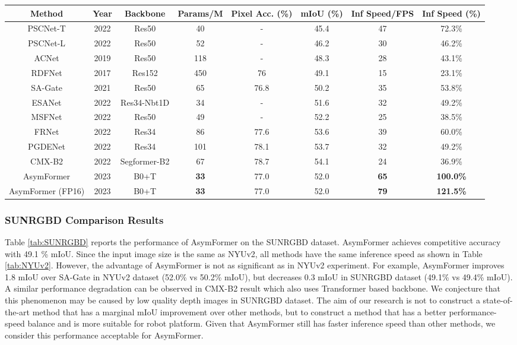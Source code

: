 \documentclass[letterpaper, 10 pt, conference]{ieeeconf}
\begin{document}
\begin{table*}[htbp]
\vspace {+0.7em}
\centering
\caption{\label{tab:NYUv2}Comparison Results on NYUv2. * denotes ADE20k pretrain. The inference speed is tested on RTX 3090 platform, (480  640) inputs.}
\begin{tabular}{c|ccc|cc|c|c}
\hline \hline
\textbf{Method} & \textbf{Year} & \textbf{Backbone} & \textbf{Params/M} & \textbf{Pixel Acc. (\%)} & \textbf{mIoU (\%)} & \textbf{Inf Speed/FPS} & \textbf{Inf Speed (\%)} \\ \hline
PSCNet-T & 2022 & Res50 & 40 & - & 45.4 & 47 & 72.3\% \\
PSCNet-L & 2022 & Res50 & 52 & - & 46.2 & 30 & 46.2\% \\
ACNet & 2019 & Res50 & 118 & - & 48.3 & 28 & 43.1\% \\
RDFNet & 2017 & Res152 & 450 & 76 & 49.1 & 15 & 23.1\% \\
SA-Gate & 2021 & Res50 & 65 & 76.8 & 50.2 & 35 & 53.8\% \\
ESANet & 2022 & Res34-Nbt1D & 34 & - & 51.6 & 32 & 49.2\% \\
MSFNet & 2022 & Res50 & 49 & - & 52.2 & 25 & 38.5\% \\
FRNet & 2022 & Res34 & 86 & 77.6 & 53.6 & 39 & 60.0\% \\
PGDENet & 2022 & Res34 & 101 & 78.1 & 53.7 & 32 & 49.2\% \\
CMX-B2 & 2022 & Segformer-B2 & 67 & 78.7 & 54.1 & 24 & 36.9\% \\ \hline
AsymFormer & 2023 & B0+T & \textbf{33} & 77.0 & 52.0 & \textbf{65} & \textbf{100.0\%} \\ \hline
AsymFormer (FP16) & 2023 & B0+T & \textbf{33} & 77.0 & 52.0 & \textbf{79} & \textbf{121.5\%} \\ \hline \hline
\end{tabular}
\vspace {-0.7em}
\end{table*}

\subsubsection{SUNRGBD Comparison Results}
Table \ref{tab:SUNRGBD} reports the performance of AsymFormer on the SUNRGBD dataset. AsymFormer achieves competitive accuracy with 49.1 \% mIoU. Since the input image size is the same as NYUv2, all methods have the same inference speed as shown in Table \ref{tab:NYUv2}. However, the advantage of AsymFormer is not as significant as in NYUv2 experiment. For example, AsymFormer improves 1.8 mIoU over SA-Gate\cite{chen2020bi} in NYUv2 dataset (52.0\% vs 50.2\% mIoU), but decreases 0.3 mIoU in SUNRGBD dataset (49.1\% vs 49.4\% mIoU). A similar performance degradation can be observed in CMX-B2 result which also uses Transformer based backbone. We conjecture that this phenomenon may be caused by low quality depth images in SUNRGBD dataset. The aim of our research is not to construct a state-of-the-art method that has a marginal mIoU improvement over other methods, but to construct a method that has a better performance-speed balance and is more suitable for robot platform. Given that AsymFormer still has faster inference speed than other methods, we consider this performance acceptable for AsymFormer.
\end{document}
